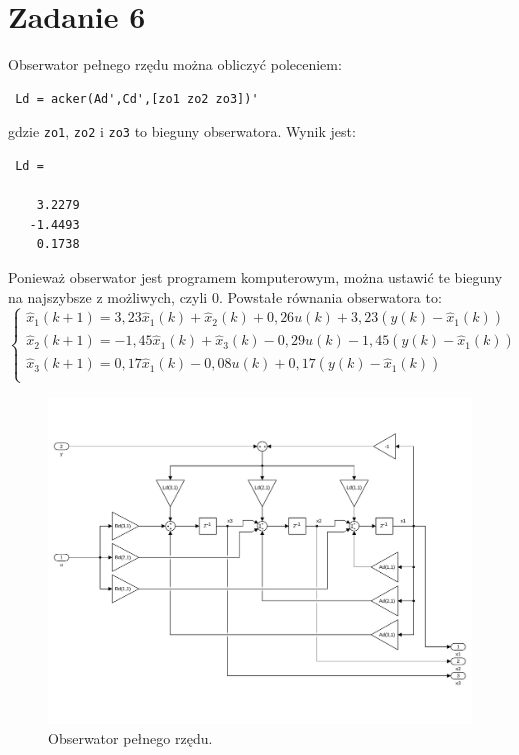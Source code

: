 \section{Zadanie 6} 
Obserwator pełnego rzędu można obliczyć poleceniem:
\begin{verbatim}
 Ld = acker(Ad',Cd',[zo1 zo2 zo3])'
\end{verbatim}
gdzie \texttt{zo1}, \texttt{zo2} i \texttt{zo3} to bieguny obserwatora. Wynik jest:
\begin{verbatim}
 Ld =

    3.2279
   -1.4493
    0.1738
\end{verbatim}

Ponieważ obserwator jest programem komputerowym, można ustawić te bieguny na najszybsze z możliwych, czyli 0. Powstałe równania obserwatora to:
\[
\left\{
\begin{array}{l}
\hat{x}_1(k+1) = 3,23 \hat{x}_1(k) + \hat{x}_2(k) + 0,26 u(k) + 3,23(y(k) - \hat{x}_1(k)) \\
\hat{x}_2(k+1) = -1,45 \hat{x}_1(k) + \hat{x}_3(k) - 0,29 u(k) - 1,45(y(k) - \hat{x}_1(k)) \\
\hat{x}_3(k+1) = 0,17 \hat{x}_1(k) - 0,08 u(k) + 0,17(y(k) - \hat{x}_1(k)) \\
\end{array}
\right.
\]

\begin{figure}[H]
\centering
 \includegraphics[width=\textwidth]{img/obs.pdf}
\caption{Obserwator pełnego rzędu.}
\end{figure}

